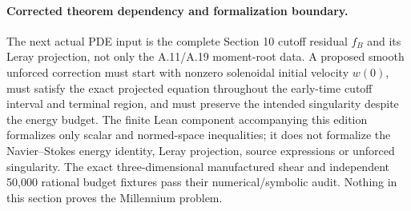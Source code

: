 \paragraph{Corrected theorem dependency and formalization boundary.}
The next actual PDE input is the complete Section 10
cutoff residual $f_B$ and its Leray projection,
not only the A.11/A.19 moment-root data.
A proposed smooth unforced correction must start with
nonzero solenoidal initial velocity $w(0)$, must satisfy
the exact projected equation throughout the early-time
cutoff interval and terminal region, and must preserve
the intended singularity despite the energy budget.
The finite Lean component accompanying this edition
formalizes only scalar and normed-space inequalities;
it does not formalize the Navier--Stokes energy identity,
Leray projection, source expressions or unforced
singularity. The exact three-dimensional manufactured
shear and independent 50,000 rational budget fixtures
pass their numerical/symbolic audit.
Nothing in this section proves the Millennium problem.
